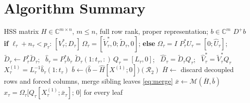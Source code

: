 \documentclass[11pt]{article}
\theoremstyle{plain}
\begin{document}
\section{Algorithm Summary}\label{sec:summary}
\begin{algorithm}[h]
\caption{Recursive Complete Minimum-Norm HSS Solve, $\mathcal M(H,b)$}
\label{alg:minnorm}
\begin{algorithmic}[1]
\Require HSS matrix $H\in\mathbb{C}^{m\times n}$, $m\le n$, full row rank, proper representation; $b\in\mathbb{C}^m$
  \State \Return $D^+b$ 
\EndIf
{}
  \State \textbf{if} $\ell_\tau+n_\tau<p_\tau$: $[V_\tau^*;D_\tau]\,\Omega_\tau=[\tilde V_\tau^*,0;\tilde D_\tau,0]$; \textbf{else} $\Omega_\tau=I$ 
  \State $P_\tau^*U_\tau=[0;\hat U_\tau]$; \ $\tilde D_\tau\gets P_\tau^*\tilde D_\tau$; \ $\hat b_\tau=P_\tau^*b_\tau$ 
  \State $\tilde D_\tau(1{:}t_\tau,:)\,Q_\tau=[L_\tau,0]$; \ $\hat D_\tau=\tilde D_\tau Q_\tau$; \ $\hat V_\tau^*=\tilde V_\tau^*Q_\tau$ 
  \State $X^{(1)}_\tau=L_\tau^{-1}\hat b_\tau(1{:}t_\tau)$ 
\EndFor
\State $\bar b\gets\big(\hat b-\hat H[X^{(1)};0]\big)(\mathcal R_2)$ 
\State $\bar H\gets$ discard decoupled rows and forced columns, merge sibling leaves \eqref{eq:merge}
\State $\bar x\gets\mathcal M(\bar H,\bar b)$ 
\State \Return $x_\tau=\Omega_\tau\big[Q_\tau[X^{(1)}_\tau;\bar x_\tau];\,0\big]$ for every leaf
\end{algorithmic}
\end{algorithm}



\end{document}
